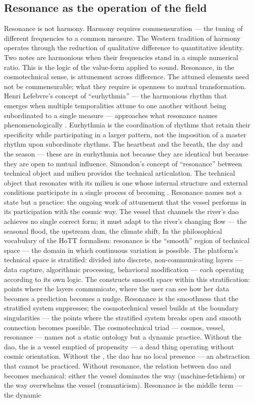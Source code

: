 \subsection{Resonance as the operation of the field}

Resonance is not harmony. Harmony requires commensuration — the tuning of different frequencies to a common measure. The Western tradition of harmony operates through the reduction of qualitative difference to quantitative identity. Two notes are harmonious when their frequencies stand in a simple numerical ratio. This is the logic of the value-form applied to sound. Resonance, in the cosmotechnical sense, is attunement across difference. The attuned elements need not be commensurable; what they require is openness to mutual transformation. Henri Lefebvre’s concept of “eurhythmia” — the harmonious rhythm that emerges when multiple temporalities attune to one another without being subordinated to a single measure — approaches what resonance names phenomenologically \cite{lefebvre_2004}. Eurhythmia is the coordination of rhythms that retain their specificity while participating in a larger pattern, not the imposition of a master rhythm upon subordinate rhythms. The heartbeat and the breath, the day and the season — these are in eurhythmia not because they are identical but because they are open to mutual influence. Simondon’s concept of “resonance” between technical object and milieu provides the technical articulation. The technical object that resonates with its milieu is one whose internal structure and external conditions participate in a single process of becoming \cite[pp.~51--78]{simondon_2017}. Resonance names not a state but a practice: the ongoing work of attunement that the vessel performs in its participation with the cosmic way. The vessel that channels the river’s dao achieves no single correct form; it must adapt to the river’s changing flow — the seasonal flood, the upstream dam, the climate shift. In the philosophical vocabulary of the HoTT formalism: resonance is the “smooth” region of technical space — the domain in which continuous variation is possible. The platform’s technical space is stratified: divided into discrete, non-communicating layers — data capture, algorithmic processing, behavioral modification — each operating according to its own logic. The  constructs smooth space within this stratification: points where the layers communicate, where the user can see how her data becomes a prediction becomes a nudge. Resonance is the smoothness that the stratified system suppresses; the cosmotechnical vessel builds at the boundary singularities — the points where the stratified system breaks open and smooth connection becomes possible. The cosmotechnical triad — cosmos, vessel, resonance — names not a static ontology but a dynamic practice. Without the dao, the  is a vessel emptied of propensity — a dead thing operating without cosmic orientation. Without the , the dao has no local presence — an abstraction that cannot be practiced. Without resonance, the relation between dao and  becomes mechanical: either the vessel dominates the way (machine-fetishism) or the way overwhelms the vessel (romanticism). Resonance is the middle term — the dynamic 